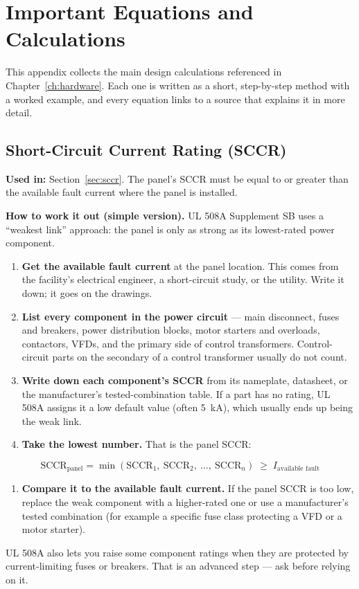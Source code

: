 \chapter{Important Equations and Calculations}
\label{app:equations}

This appendix collects the main design calculations referenced in Chapter~\ref{ch:hardware}. Each one is written as a short, step-by-step method with a worked example, and every equation links to a source that explains it in more detail.

\section{Short-Circuit Current Rating (SCCR)}
\label{app:eq-sccr}
\textbf{Used in:} Section~\ref{sec:sccr}. The panel's SCCR must be equal to or greater than the available fault current where the panel is installed.

\textbf{How to work it out (simple version).} UL 508A Supplement SB uses a ``weakest link'' approach: the panel is only as strong as its lowest-rated power component.
\begin{enumerate}[itemsep=2pt]
  \item \textbf{Get the available fault current} at the panel location. This comes from the facility's electrical engineer, a short-circuit study, or the utility. Write it down; it goes on the drawings.
  \item \textbf{List every component in the power circuit} --- main disconnect, fuses and breakers, power distribution blocks, motor starters and overloads, contactors, VFDs, and the primary side of control transformers. Control-circuit parts on the secondary of a control transformer usually do not count.
  \item \textbf{Write down each component's SCCR} from its nameplate, datasheet, or the manufacturer's tested-combination table. If a part has no rating, UL 508A assigns it a low default value (often 5~kA), which usually ends up being the weak link.
  \item \textbf{Take the lowest number.} That is the panel SCCR:
\end{enumerate}
\[
  \text{SCCR}_{\text{panel}} = \min\left(\text{SCCR}_{1},\ \text{SCCR}_{2},\ \dots,\ \text{SCCR}_{n}\right) \;\geq\; I_{\text{available fault}}
\]
\begin{enumerate}[resume,itemsep=2pt]
  \item \textbf{Compare it to the available fault current.} If the panel SCCR is too low, replace the weak component with a higher-rated one or use a manufacturer's tested combination (for example a specific fuse class protecting a VFD or a motor starter).
\end{enumerate}
UL 508A also lets you raise some component ratings when they are protected by current-limiting fuses or breakers. That is an advanced step --- ask before relying on it.

